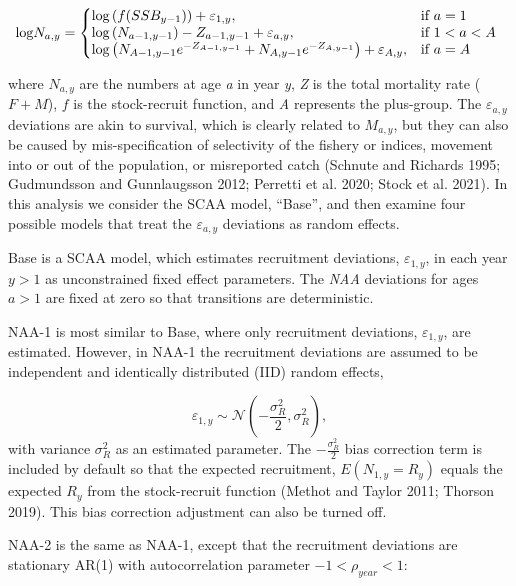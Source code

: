 \documentclass[]{article}
\begin{document}
\begin{equation}
\label{eq:NAA}
  \text{log}N_{a,y}=\left\{
    \begin{array}{@{}lll@{}}
      \text{log} \left( f(SSB_{y-1}) \right) + \varepsilon_{1,y}, & \text{if}\ a = 1 \\
      \text{log} \left( N_{a-1,y-1} \right) - Z_{a-1,y-1} + \varepsilon_{a,y}, & \text{if}\ 1 < a < A \\
      \text{log} \left( N_{A-1,y-1} e^{-Z_{A-1,y-1}} + N_{A,y-1} e^{-Z_{A,y-1}} \right) + \varepsilon_{A,y}, & \text{if}\ a = A
    \end{array}\right.
\end{equation}

where \(N_{a,y}\) are the numbers at age \emph{a} in year \emph{y},
\emph{Z} is the total mortality rate (\(F + M\)), \(f\) is the
stock-recruit function, and \emph{A} represents the plus-group. The
\(\varepsilon_{a,y}\) deviations are akin to survival, which is clearly
related to \(M_{a,y}\), but they can also be caused by mis-specification
of selectivity of the fishery or indices, movement into or out of the
population, or misreported catch (Schnute and Richards 1995; Gudmundsson
and Gunnlaugsson 2012; Perretti et al. 2020; Stock et al. 2021). In this
analysis we consider the SCAA model, ``Base'', and then examine four
possible models that treat the \(\varepsilon_{a,y}\) deviations as
random effects.

Base is a SCAA model, which estimates recruitment deviations,
\(\varepsilon_{1,y}\), in each year \(y > 1\) as unconstrained fixed
effect parameters. The \emph{NAA} deviations for ages \(a > 1\) are
fixed at zero so that transitions are deterministic.

NAA-1 is most similar to Base, where only recruitment deviations,
\(\varepsilon_{1,y}\), are estimated. However, in NAA-1 the recruitment
deviations are assumed to be independent and identically distributed
(IID) random effects,

\[\varepsilon_{1,y} \sim \mathcal{N}\left( - \frac{\sigma^2_R}{2}, \sigma^2_R \right),\]
with variance \(\sigma^2_R\) as an estimated parameter. The
\(- \frac{\sigma^2_R}{2}\) bias correction term is included by default
so that the expected recruitment, \(E(N_{1,y} = R_y)\) equals the
expected \(R_y\) from the stock-recruit function (Methot and Taylor
2011; Thorson 2019). This bias correction adjustment can also be turned
off.

NAA-2 is the same as NAA-1, except that the recruitment deviations are
stationary AR(1) with autocorrelation parameter \(-1<\rho_{year}<1\):
\end{document}
